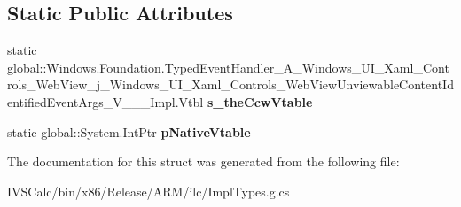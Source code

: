 \subsection*{Static Public Attributes}
\begin{DoxyCompactItemize}
\item 
\mbox{\label{struct_windows_1_1_foundation_1_1_typed_event_handler___a___windows___u_i___xaml___controls___we525068a3adb52520cb6e4320f7738461_a98519c243bbe29423b98959d19132a58}} 
static global\+::\+Windows.\+Foundation.\+Typed\+Event\+Handler\+\_\+\+A\+\_\+\+Windows\+\_\+\+U\+I\+\_\+\+Xaml\+\_\+\+Controls\+\_\+\+Web\+View\+\_\+j\+\_\+\+Windows\+\_\+\+U\+I\+\_\+\+Xaml\+\_\+\+Controls\+\_\+\+Web\+View\+Unviewable\+Content\+Identified\+Event\+Args\+\_\+\+V\+\_\+\+\_\+\+\_\+\+Impl.\+Vtbl {\bfseries s\+\_\+the\+Ccw\+Vtable}
\item 
\mbox{\label{struct_windows_1_1_foundation_1_1_typed_event_handler___a___windows___u_i___xaml___controls___we525068a3adb52520cb6e4320f7738461_a7f35d250a004b8139b49f9392e068bec}} 
static global\+::\+System.\+Int\+Ptr {\bfseries p\+Native\+Vtable}
\end{DoxyCompactItemize}


The documentation for this struct was generated from the following file\+:\begin{DoxyCompactItemize}
\item 
I\+V\+S\+Calc/bin/x86/\+Release/\+A\+R\+M/ilc/Impl\+Types.\+g.\+cs\end{DoxyCompactItemize}
